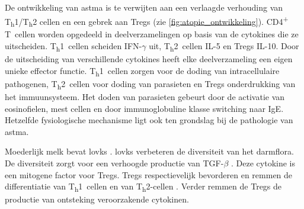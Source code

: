 \documentclass[abstract=true]{scrartcl}
\begin{document}
De ontwikkeling van astma is te verwijten aan een verlaagde verhouding van T\textsubscript{h}1/T\textsubscript{h}2 cellen en een gebrek aan Tregs (zie \cref{fig:atopie_ontwikkeling}). CD4\textsuperscript{+} T~cellen worden opgedeeld in deelverzamelingen op basis van de cytokines die ze uitscheiden. T\textsubscript{h}1~cellen scheiden IFN-$\gamma$ uit, T\textsubscript{h}2~cellen IL-5 en Tregs IL-10. Door de uitscheiding van verschillende cytokines heeft elke deelverzameling een eigen unieke effector functie. T\textsubscript{h}1~cellen zorgen voor de doding van intracellulaire pathogenen, T\textsubscript{h}2~cellen voor doding van parasieten en Tregs onderdrukking van het immuunsysteem. Het doden van parasieten gebeurt door de activatie van eosinofielen, mest cellen en door immunoglobuline klasse switching naar IgE. Hetzelfde fysiologische mechanisme ligt ook ten grondslag bij de pathologie van astma.

Moederlijk melk bevat \glspl{lovk} \cite{das2002essential}. \Glspl{lovk} verbeteren de diversiteit van het darmflora. De diversiteit zorgt voor een verhoogde productie van TGF-$\beta$ \cite{das2002essential,Das_2004}. Deze cytokine is een mitogene factor voor Tregs. Tregs respectievelijk bevorderen en remmen de differentiatie van T\textsubscript{h}1~cellen en van T\textsubscript{h}2-cellen \cite{penttila2010milk}. Verder remmen de Tregs de productie van ontsteking veroorzakende cytokinen. 


\printglossaries
\printbibliography 
\end{document}
